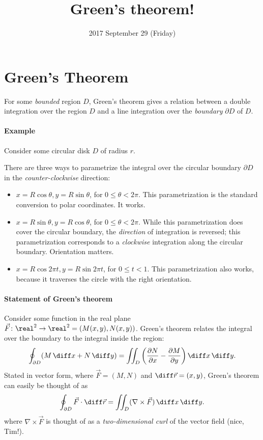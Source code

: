 \documentclass{multi}
\title{Green's theorem!}
\date{2017 September 29 (Friday)}
\begin{document}
\section*{Green's Theorem}

For some \emph{bounded} region \(D\), Green's theorem gives a relation between a double integration over the region \(D\) and a line integration over the \emph{boundary} \(\partial D\) of \(D\).

\paragraph{Example}

Consider some circular disk \(D\) of radius \(r\).

There are three ways to parametrize the integral over the circular boundary \(\partial D\) in the \emph{counter-clockwise} direction:
\begin{itemize}
\item \(x = R \cos \theta, y = R \sin \theta\), for \(0 \le \theta < 2 \pi\). This parametrization is the standard conversion to polar coordinates. It works.
\item \(x = R \sin \theta, y = R \cos \theta\), for \(0 \le \theta < 2 \pi\). While this parametrization does cover the circular boundary, the \emph{direction} of integration is reversed; this parametrization corresponds to a \emph{clockwise} integration along the circular boundary. Orientation matters.
\item \(x = R \cos 2\pi t, y = R \sin 2 \pi t\), for \(0 \le t < 1\). This parametrization also works, because it traverses the circle with the right orientation.
\end{itemize}

\paragraph{Statement of Green's theorem}

Consider some function in the real plane \(\vec F \colon \real^2 \to \real^2 = (M(x, y), N(x, y))\). Green's theorem relates the integral over the boundary to the integral inside the region:
\[
    \oint_{\partial D} (M \, \diff x + N \, \diff y) = \iint_{D} \left(\frac{\partial N}{\partial x} - \frac{\partial M}{\partial y}\right) \diff x \, \diff y.
\]
Stated in vector form, where \(\vec F = (M, N)\) and \(\diff \vec r = (x, y)\), Green's theorem can easily be thought of as
\[
    \oint_{\partial D} \vec F \cdot \diff \vec r = \iint_{D} (\nabla \times \vec F) \, \diff x \, \diff y.
\]
where \(\nabla \times \vec F\) is thought of as a \emph{two-dimensional curl} of the vector field (nice, Tim!).
\end{document}
